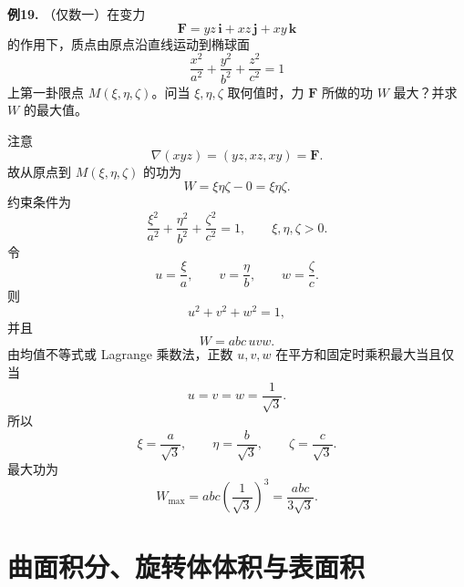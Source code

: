 \begin{problemblock}
\textbf{例19.} （仅数一）在变力
\[
\mathbf F=yz\,\mathbf i+xz\,\mathbf j+xy\,\mathbf k
\]
的作用下，质点由原点沿直线运动到椭球面
\[
\frac{x^2}{a^2}+\frac{y^2}{b^2}+\frac{z^2}{c^2}=1
\]
上第一卦限点 \(M(\xi,\eta,\zeta)\)。问当 \(\xi,\eta,\zeta\) 取何值时，力 \(\mathbf F\) 所做的功 \(W\) 最大？并求 \(W\) 的最大值。
\end{problemblock}
\begin{solutionblock}
注意
\[
\nabla(xyz)=(yz,xz,xy)=\mathbf F.
\]
故从原点到 \(M(\xi,\eta,\zeta)\) 的功为
\[
W=\xi\eta\zeta-0=\xi\eta\zeta.
\]
约束条件为
\[
\frac{\xi^2}{a^2}+\frac{\eta^2}{b^2}+\frac{\zeta^2}{c^2}=1,
\qquad \xi,\eta,\zeta>0.
\]
令
\[
u=\frac{\xi}{a},\qquad v=\frac{\eta}{b},\qquad w=\frac{\zeta}{c}.
\]
则
\[
u^2+v^2+w^2=1,
\]
并且
\[
W=abc\,uvw.
\]
由均值不等式或 Lagrange 乘数法，正数 \(u,v,w\) 在平方和固定时乘积最大当且仅当
\[
u=v=w=\frac1{\sqrt3}.
\]
所以
\[
\xi=\frac a{\sqrt3},\qquad
\eta=\frac b{\sqrt3},\qquad
\zeta=\frac c{\sqrt3}.
\]
最大功为
\[
W_{\max}=abc\left(\frac1{\sqrt3}\right)^3
=\frac{abc}{3\sqrt3}.
\]
\end{solutionblock}

\section{曲面积分、旋转体体积与表面积}

